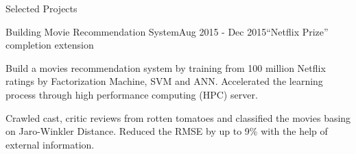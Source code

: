 \documentclass{resume} %
\begin{document}
\begin{rSection}{Selected Projects}










\begin{rSubsection}{Building Movie Recommendation System}{Aug 2015 - Dec 2015}{``Netflix Prize'' completion extension}{} 
\item Build a movies recommendation system by training from 100 million
Netflix ratings
by Factorization Machine, SVM and ANN. Accelerated the learning process through high performance computing (HPC) server.
\item Crawled cast, critic reviews from rotten tomatoes and classified the movies basing on Jaro-Winkler Distance. Reduced the RMSE by up to 9\% with the help of external information.
\end{rSubsection}



\end{rSection}
\end{document}
